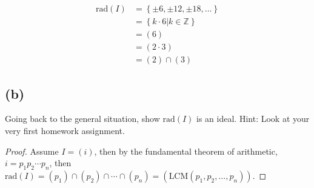 \documentclass[10pt]{armath}
\newcommand{\Z}{\mathbb{Z}}
\newcommand{\rad}[1]{\text{rad}\left(#1\right)}
\begin{document}
\begin{align*}
  \rad{I}&=\left\{\pm6, \pm12, \pm18, \ldots\right\}\\
  &=\left\{k\cdot 6|k\in\Z\right\}\\
  &=(6)\\
  &=(2\cdot 3)\\
  &=(2)\cap(3)
\end{align*}

\subsection*{(b)}%
\label{sub:_b3_}

Going back to the general situation, show $\rad{I}$ is an ideal. Hint: Look at
your very first homework assignment.

\begin{proof}
  Assume $I=(i)$, then by the fundamental theorem of arithmetic,
  $i=p_1p_2\cdots p_n$, then
  $\rad{I}=(p_1)\cap(p_2)\cap\cdots\cap(p_n)=(\text{LCM}(p_1,p_2,\ldots,p_n))$.
\end{proof}
\end{document}
